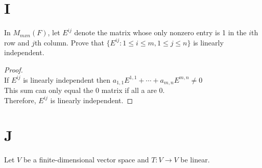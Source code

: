 \documentclass[11pt]{scrartcl}
\begin{document}
\section{I} 
In $M_{mxn}(F)$, let $E^{ij}$ denote the matrix whose only nonzero entry is 1 in the $i$th row and $j$th column. Prove that $\{E^{ij}: 1 \leq i \leq m,
1 \leq j \leq n\}$ is linearly independent.
\begin{proof}
	\-\\
	If $E^{ij}$ is linearly independent then $a_{1,1}E^{1,1} + \cdots + a_{m,n}E^{m,n} \neq 0$\\
	This sum can only equal the 0 matrix if all a are 0.\\
	Therefore, $E^{ij}$ is linearly independent.
\end{proof}
\section{J}
Let $V$ be a finite-dimensional vector space and $T: V \rightarrow V$ be linear.
\end{document}

